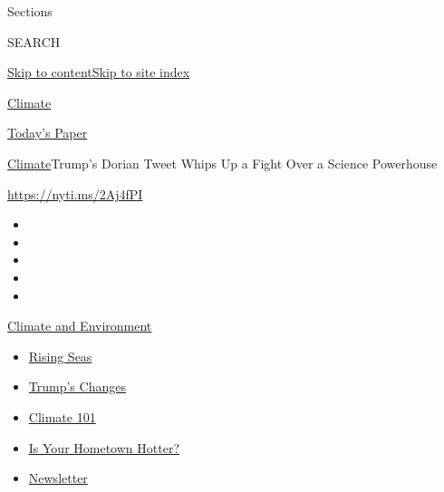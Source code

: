Sections

SEARCH

\protect\hyperlink{site-content}{Skip to
content}\protect\hyperlink{site-index}{Skip to site index}

\href{https://www.nytimes3xbfgragh.onion/section/climate}{Climate}

\href{https://myaccount.nytimes3xbfgragh.onion/auth/login?response_type=cookie\&client_id=vi}{}

\href{https://www.nytimes3xbfgragh.onion/section/todayspaper}{Today's
Paper}

\href{/section/climate}{Climate}\textbar{}Trump's Dorian Tweet Whips Up
a Fight Over a Science Powerhouse

\url{https://nyti.ms/2Aj4fPI}

\begin{itemize}
\item
\item
\item
\item
\item
\end{itemize}

\href{https://www.nytimes3xbfgragh.onion/section/climate?action=click\&pgtype=Article\&state=default\&region=TOP_BANNER\&context=storylines_menu}{Climate
and Environment}

\begin{itemize}
\tightlist
\item
  \href{https://www.nytimes3xbfgragh.onion/2020/07/30/climate/sea-level-inland-floods.html?action=click\&pgtype=Article\&state=default\&region=TOP_BANNER\&context=storylines_menu}{Rising
  Seas}
\item
  \href{https://www.nytimes3xbfgragh.onion/interactive/2020/climate/trump-environment-rollbacks.html?action=click\&pgtype=Article\&state=default\&region=TOP_BANNER\&context=storylines_menu}{Trump's
  Changes}
\item
  \href{https://www.nytimes3xbfgragh.onion/interactive/2020/04/19/climate/climate-crash-course-1.html?action=click\&pgtype=Article\&state=default\&region=TOP_BANNER\&context=storylines_menu}{Climate
  101}
\item
  \href{https://www.nytimes3xbfgragh.onion/interactive/2018/08/30/climate/how-much-hotter-is-your-hometown.html?action=click\&pgtype=Article\&state=default\&region=TOP_BANNER\&context=storylines_menu}{Is
  Your Hometown Hotter?}
\item
  \href{https://www.nytimes3xbfgragh.onion/newsletters/climate-change?action=click\&pgtype=Article\&state=default\&region=TOP_BANNER\&context=storylines_menu}{Newsletter}
\end{itemize}

